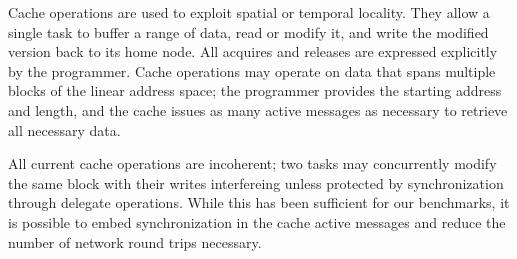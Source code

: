 Cache operations are used to exploit spatial or temporal
locality. They allow a single task to buffer a range of data, read or
modify it, and write the modified version back to its home node. All
acquires and releases are expressed explicitly by the
programmer. Cache operations may operate on data that spans multiple
blocks of the linear address space; the programmer provides the
starting address and length, and the cache issues as many active
messages as necessary to retrieve all necessary data.

All current cache operations are incoherent; two tasks may
concurrently modify the same block with their writes interfereing
unless protected by synchronization through delegate operations. While
this has been sufficient for our benchmarks, it is possible to embed
synchronization in the cache active messages and reduce the number of
network round trips necessary.


